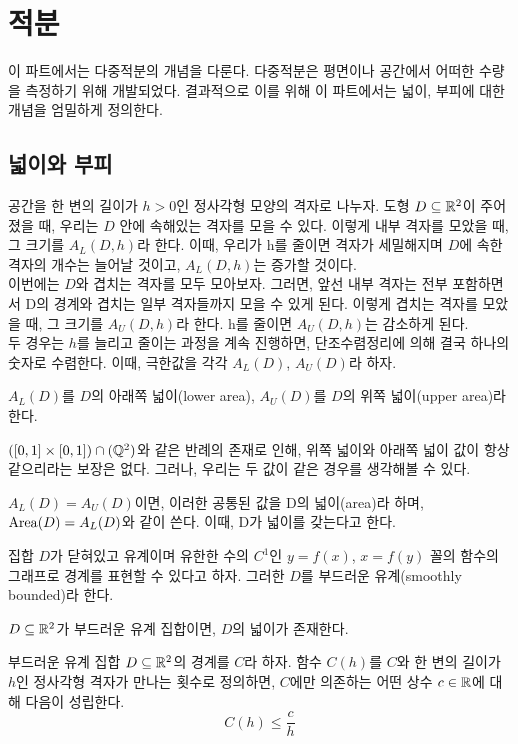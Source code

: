 \section{적분}
이 파트에서는 다중적분의 개념을 다룬다. 다중적분은 평면이나 공간에서 어떠한 수량을 측정하기 위해 개발되었다. 결과적으로 이를 위해 이 파트에서는 넓이, 부피에 대한 개념을 엄밀하게 정의한다.

\subsection{넓이와 부피}
공간을 한 변의 길이가 $h>0$인 정사각형 모양의 격자로 나누자. 도형 $D\subseteq\mathbb{R}^2$이 주어졌을 때, 우리는 $D$ 안에 속해있는 격자를 모을 수 있다. 이렇게 내부 격자를 모았을 때, 그 크기를 $A_L(D,h)$라 한다. 이때, 우리가 h를 줄이면 격자가 세밀해지며 $D$에 속한 격자의 개수는 늘어날 것이고, $A_L(D,h)$는 증가할 것이다.\\
이번에는 $D$와 겹치는 격자를 모두 모아보자. 그러면, 앞선 내부 격자는 전부 포함하면서 D의 경계와 겹치는 일부 격자들까지 모을 수 있게 된다. 이렇게 겹치는 격자를 모았을 때, 그 크기를 $A_U(D,h)$라 한다. h를 줄이면 $A_U(D,h)$는 감소하게 된다.\\
두 경우는 $h$를 늘리고 줄이는 과정을 계속 진행하면, 단조수렴정리에 의해 결국 하나의 숫자로 수렴한다. 이때, 극한값을 각각 $A_L(D)$, $A_U(D)$라 하자.
\begin{definition}[위쪽/아래쪽 넓이]
$A_L(D)$를 $D$의 아래쪽 넓이(lower area), $A_U(D)$를 $D$의 위쪽 넓이(upper area)라 한다.
\end{definition}
$([0,1]\times[0,1])\cap (\mathbb{Q}^2)$와 같은 반례의 존재로 인해, 위쪽 넓이와 아래쪽 넓이 값이 항상 같으리라는 보장은 없다. 그러나, 우리는 두 값이 같은 경우를 생각해볼 수 있다.
\begin{definition}[넓이]
$A_L(D)=A_U(D)$이면, 이러한 공통된 값을 D의 넓이(area)라 하며, $\mathrm{Area}(D)=A_L(D)$와 같이 쓴다. 이때, D가 넓이를 갖는다고 한다.
\end{definition}
\begin{definition}
집합 $D$가 닫혀있고 유계이며 유한한 수의 $C^1$인 $y=f(x)$, $x=f(y)$ 꼴의 함수의 그래프로 경계를 표현할 수 있다고 하자. 그러한 $D$를 부드러운 유계(smoothly bounded)라 한다.
\end{definition}
\begin{theorem}
$D\subseteq\mathbb{R}^2$가 부드러운 유계 집합이면, $D$의 넓이가 존재한다.
\end{theorem}
\begin{theorem}
부드러운 유계 집합 $D\subseteq\mathbb{R}^2$의 경계를 $C$라 하자. 함수 $C(h)$를 $C$와 한 변의 길이가 $h$인 정사각형 격자가 만나는 횟수로 정의하면, $C$에만 의존하는 어떤 상수 $c\in\mathbb{R}$에 대해 다음이 성립한다.
$$
C(h)\le\frac{c}{h}
$$
\end{theorem}
